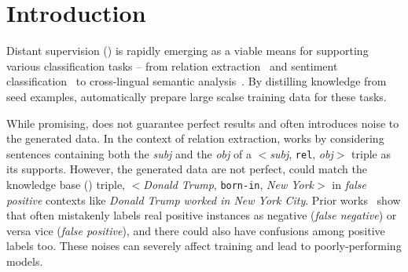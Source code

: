 \section{Introduction}

Distant supervision (\DS) is rapidly emerging as a viable means for supporting various classification tasks -- from relation extraction~\cite{mintz2009distant} and sentiment classification~\cite{go2009twitter} to cross-lingual semantic
analysis~\cite{fang2016learning}.
By distilling knowledge from seed examples, \DS automatically prepare large scalse training data for these tasks.



While promising, \DS does not guarantee perfect results and often introduces noise to the
generated data. In the context of relation extraction, 
\DS works by considering sentences containing both the \emph{subj} and the \emph{obj} of a $<$\emph{subj}, \texttt{rel}, \emph{obj}$>$ triple as its supports. However, the generated data are not perfect, 
\DS could match the knowledge base (\KB) triple, $<$\emph{Donald Trump},
\texttt{born-in}, \emph{New York}$>$  in \emph{false positive} contexts like \emph{Donald Trump worked in New York City}.
Prior works~\cite{takamatsu2012reducing,ritter2013modeling} show that \DS often mistakenly labels real positive instances as negative (\emph{false negative}) or
versa vice (\emph{false positive}), and there could also have confusions among positive labels too. These noises can
severely affect training and lead to poorly-performing models.

